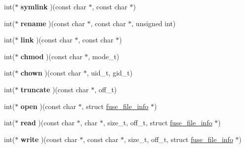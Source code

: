 \begin{DoxyCompactItemize}
\item 
int($\ast$ {\bfseries symlink} )(const char $\ast$, const char $\ast$)\hypertarget{structfuse__operations_a3039bb250169cf41be015faa0f899a38}{}\label{structfuse__operations_a3039bb250169cf41be015faa0f899a38}

\item 
int($\ast$ {\bfseries rename} )(const char $\ast$, const char $\ast$, unsigned int)\hypertarget{structfuse__operations_ad0e98825661f523291253f1913f9ffd2}{}\label{structfuse__operations_ad0e98825661f523291253f1913f9ffd2}

\item 
int($\ast$ {\bfseries link} )(const char $\ast$, const char $\ast$)\hypertarget{structfuse__operations_aca657a1bcec2528e4e45add8f20de1f5}{}\label{structfuse__operations_aca657a1bcec2528e4e45add8f20de1f5}

\item 
int($\ast$ {\bfseries chmod} )(const char $\ast$, mode\+\_\+t)\hypertarget{structfuse__operations_a21e1cd230612b5140006edf0e490f02f}{}\label{structfuse__operations_a21e1cd230612b5140006edf0e490f02f}

\item 
int($\ast$ {\bfseries chown} )(const char $\ast$, uid\+\_\+t, gid\+\_\+t)\hypertarget{structfuse__operations_a414d7b818e280aa2e753aac97734ae4d}{}\label{structfuse__operations_a414d7b818e280aa2e753aac97734ae4d}

\item 
int($\ast$ {\bfseries truncate} )(const char $\ast$, off\+\_\+t)\hypertarget{structfuse__operations_a3f6513ffa448b6646265266ec9bf2cb2}{}\label{structfuse__operations_a3f6513ffa448b6646265266ec9bf2cb2}

\item 
int($\ast$ {\bfseries open} )(const char $\ast$, struct \hyperlink{structfuse__file__info}{fuse\+\_\+file\+\_\+info} $\ast$)\hypertarget{structfuse__operations_a08a085fceedd8770e3290a80aa9645ac}{}\label{structfuse__operations_a08a085fceedd8770e3290a80aa9645ac}

\item 
int($\ast$ {\bfseries read} )(const char $\ast$, char $\ast$, size\+\_\+t, off\+\_\+t, struct \hyperlink{structfuse__file__info}{fuse\+\_\+file\+\_\+info} $\ast$)\hypertarget{structfuse__operations_a272960bfd96a0100cbadc4e5a8886038}{}\label{structfuse__operations_a272960bfd96a0100cbadc4e5a8886038}

\item 
int($\ast$ {\bfseries write} )(const char $\ast$, const char $\ast$, size\+\_\+t, off\+\_\+t, struct \hyperlink{structfuse__file__info}{fuse\+\_\+file\+\_\+info} $\ast$)\hypertarget{structfuse__operations_a1fdc611027324dd68a550f9662db1fac}{}\label{structfuse__operations_a1fdc611027324dd68a550f9662db1fac}


\end{DoxyCompactItemize}
